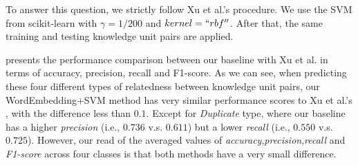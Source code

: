 \begin{table}[!htp]
\centering
\caption{Comparison of our baseline method with Xu et al's }
\label{tab:baseline}
\end{table}

To answer this question, we strictly follow Xu et al.'s procedure\cite{xu2016predicting}. We 
use the SVM from scikit-learn with $\gamma = 1/200$ and $kernel= ``rbf''$. After that,
the same training and testing knowledge unit pairs are applied.

  presents the performance comparison between our baseline with
 Xu et al. in terms of accuracy, precision, recall and F1-score. As we can see, 
 when predicting these four different types of relatedness between knowledge unit pairs,
 our WordEmbedding+SVM method has  very  similar performance scores  to Xu et al.'s
, with the difference less than $0.1$.  Except for {\it Duplicate} type, where our baseline 
has a higher {\it precision} (i.e., $0.736$ v.s. $0.611$) but a lower {\it recall} (i.e., $0.550$ v.s.$0.725$).
However, our read of the averaged values of {\it accuracy},{\it precision},{\it recall}
and {\it F1-score} across four classes is that both methods have
a very small difference.

